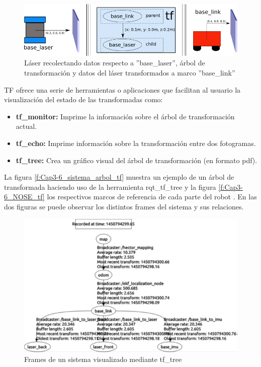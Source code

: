         \begin{figure}[htb]
            \centering
            \includegraphics[width=1.0\linewidth]{Main/Chapter3/Images3/tf_robot.png}
            \caption{Láser recolectando datos respecto a ''base\_laser'', árbol de transformación y datos del láser transformados a marco ''base\_link'' }
            \label{f:Cap3-6_nose1}
        \end{figure}    
        
        
         TF ofrece una serie de herramientas o aplicaciones que facilitan al usuario la visualización del estado de las transformadas como:
        
        \begin{itemize}
            \item \textbf{tf\_monitor:} Imprime la información sobre el árbol de transformación actual.
            \item \textbf{tf\_echo:} Imprime información sobre la transformación entre dos fotogramas.
            \item \textbf{tf\_tree:} Crea un gráfico visual del árbol de transformación (en formato pdf).
        \end{itemize}
        
        \newpage
        La figura \eqref{f:Cap3-6_sistema_arbol_tf} muestra un ejemplo de un árbol de transformada haciendo uso de la herramienta rqt\_tf\_tree y la figura \eqref{f:Cap3-6_NOSE_tf} los respectivos marcos de referencia de cada parte del robot . En las dos figuras se puede observar los distintos frames del sistema y sus relaciones.
        
        \begin{figure}[htb]
            \centering
            \includegraphics[width=0.7\linewidth]{Main/Chapter3/Images3/3-6/ejemplo-frames-sistema-arbol.png}
            \caption{Frames de un sistema visualizado mediante tf\_tree}
            \label{f:Cap3-6_sistema_arbol_tf}
        \end{figure} 
        

